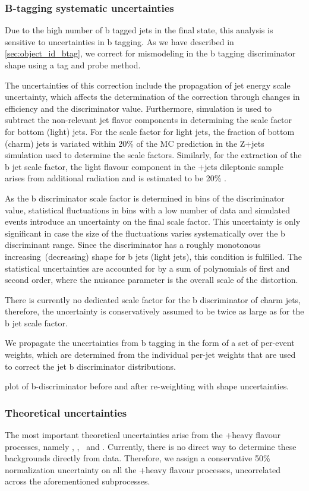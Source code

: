 \subsubsection{B-tagging systematic uncertainties}
Due to the high number of b tagged jets in the final state, this analysis is sensitive to uncertainties in b tagging. As we have described in \cref{sec:object_id_btag}, we correct for mismodeling in the b tagging discriminator shape using a tag and probe method.

The uncertainties of this correction include the propagation of jet energy scale uncertainty, which affects the determination of the correction through changes in efficiency and the discriminator value. Furthermore, simulation is used to subtract the non-relevant jet flavor components in determining the scale factor for bottom (light) jets. For the scale factor for light jets, the fraction of bottom (charm) jets is variated within 20\% of the MC prediction in the Z+jets simulation used to determine the scale factors. Similarly, for the extraction of the b jet scale factor, the light flavour component in the \ttbar+jets dileptonic sample arises from additional radiation and is estimated to be 20\% \cite{CMS:2016kkf}.

As the b discriminator scale factor is determined in bins of the discriminator value, statistical fluctuations in bins with a low number of data and simulated events introduce an uncertainty on the final scale factor. This uncertainty is only significant in case the size of the fluctuations varies systematically over the b discriminant range. Since the discriminator has a roughly monotonous increasing (decreasing) shape for b jets (light jets), this condition is fulfilled. The statistical uncertainties are accounted for by a sum of polynomials of first and second order, where the nuisance parameter is the overall scale of the distortion.

There is currently no dedicated scale factor for the b discriminator of charm jets, therefore, the uncertainty is conservatively assumed to be twice as large as for the b jet scale factor.

We propagate the uncertainties from b tagging in the form of a set of per-event weights, which are determined from the individual per-jet weights that are used to correct the jet b discriminator distributions.

\fix plot of b-discriminator before and after re-weighting with shape uncertainties.

\subsubsection{Theoretical uncertainties}
The most important theoretical uncertainties arise from the \ttbar+heavy flavour processes, namely \ttbb, \tttwob, \ttb~and \ttcc. Currently, there is no direct way to determine these backgrounds directly from data. Therefore, we assign a conservative 50\% normalization uncertainty on all the \ttbar+heavy flavour processes, uncorrelated across the aforementioned subprocesses.

